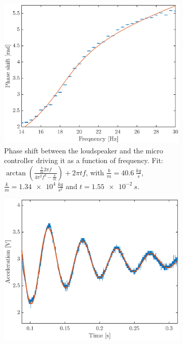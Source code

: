 \documentclass[12pt,oneside,a4paper]{article}
\numberwithin{equation}{section}
\begin{document}
{{{{\begin{figure}[h]
	\centering
	\begin{subfigure}[t]{0.49\textwidth}
		\includegraphics[width=\textwidth]{pshiftplot.eps} 
		\caption{Phase shift between the loudspeaker and the micro controller 
		driving it as a function of frequency. Fit:  $\arctan 
		\left(\frac{\frac{b}{m} 2\pi 
		f}{4\pi^2f^2-\frac{k}{m}}\right)+2\pi t f$, 
		with $\frac{b}{m}=\SI{40.6}{\frac{kg}{s}}$, 
		$\frac{k}{m}=\SI{1.34e4}{\frac{kg}{s^2}}$
		and $t=\SI{1.55e-2}{s}$.}
		\label{phaseshift_plot}
	\end{subfigure} \hfill 
	\begin{subfigure}[t]{0.49\textwidth}
		\centering
		\includegraphics[width=\textwidth]{ringout.eps}

\end{subfigure}
\end{figure}}}}}
\end{document}
